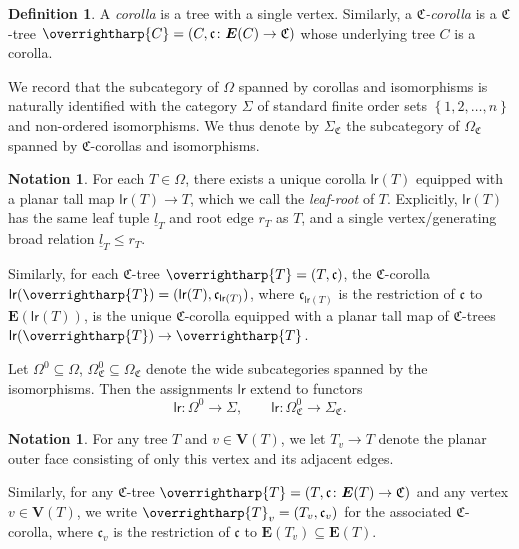 \documentclass[a4paper,10pt
,draft
]{article}%
\numberwithin{equation}{section}
\numberwithin{figure}{section}
\theoremstyle{definition} %
\newtheorem{definition}[equation]{Definition}%
\newtheorem{notation}[equation]{Notation}%
\newcommand{\set}[1]{\left\{#1\right\}}%
\newcommand{\vect}[1]{\text{\overrightharp{\ensuremath{#1}}}}
\newcommand{\1}{\ensuremath{\mathbbm 1}}%
\begin{document}
\begin{definition}
        A \textit{corolla} is a tree with a single vertex.
        Similarly, a \textit{$\mathfrak C$-corolla} is
        a $\mathfrak C$-tree $\vect C = (C, \mathfrak c \colon \boldsymbol{E}(C) \to \mathfrak C)$
        whose underlying tree $C$ is a corolla.

        We record that the subcategory of $\Omega$ spanned by corollas and isomorphisms is naturally identified with
        the category $\Sigma$ of standard finite order sets $\set{1, 2, \dots, n}$ and non-ordered isomorphisms.
        We thus denote by $\Sigma_{\mathfrak C}$ the subcategory of $\Omega_{\mathfrak C}$ spanned by $\mathfrak C$-corollas and isomorphisms.        
\end{definition}

\begin{notation}
     \label{LR_NOT}
     For each $T \in \Omega$, there exists a unique corolla $\mathsf{lr}(T)$ equipped with a planar tall map
     $\mathsf{lr}(T) \to T$,
     which we call the \textit{leaf-root} of $T$.
     Explicitly, $\mathsf{lr}(T)$ has the same leaf tuple $\underline{l}_T$ and root edge $r_T$ as $T$,
     and a single vertex/generating broad relation $\underline{l}_T \leq r_T$.
     
     Similarly, for each $\mathfrak C$-tree $\vect T = (T, \mathfrak c)$,
     the $\mathfrak C$-corolla
     $\mathsf{lr}(\vect T) = (\mathsf{lr}(T), \mathfrak c_{\mathsf{lr}(T)})$,
     where $\mathfrak c_{\mathsf{lr}(T)}$ is the restriction of $\mathfrak c$ to $\boldsymbol{E}(\mathsf{lr}(T))$,
     is the unique $\mathfrak C$-corolla
     equipped with a planar tall map of $\mathfrak C$-trees $\mathsf{lr}(\vect T) \to \vect T$.

     Let $\Omega^0 \subseteq \Omega$, $\Omega_{\mathfrak C}^0 \subseteq \Omega_{\mathfrak C}$
     denote the wide subcategories spanned by the isomorphisms.
     Then the assignments $\mathsf{lr}$ extend to functors
     \[
             \mathsf{lr} \colon \Omega^0 \to \Sigma,
             \qquad
             \mathsf{lr} \colon \Omega_{\mathfrak C}^0 \to \Sigma_{\mathfrak C}.
     \]
\end{notation}


\begin{notation}
        \label{TV_NOT}
        For any tree $T$ and $v \in \boldsymbol{V}(T)$,
        we let $T_v \to T$ denote the planar outer face consisting of only this vertex and its adjacent edges.
        
        Similarly, for any $\mathfrak C$-tree $\vect T = (T, \mathfrak c \colon \boldsymbol{E}(T) \to \mathfrak C)$
        and any vertex $v \in \boldsymbol{V}(T)$,
        we write $\vect T_v = (T_v, \mathfrak c_v)$ for the associated $\mathfrak C$-corolla,
        where $\mathfrak c_v$ is the restriction of $\mathfrak c$ to $\boldsymbol{E}(T_v) \subseteq \boldsymbol{E}(T)$. 
\end{notation}
\end{document}
